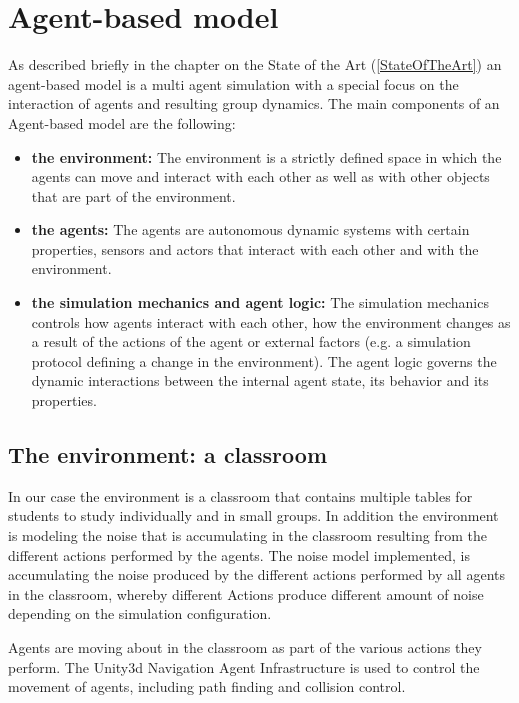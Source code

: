 \section{Agent-based model}
As described briefly in the chapter on the State of the Art (\ref{StateOfTheArt})
an agent-based model is a multi agent simulation with a special focus on the interaction
of agents and resulting group dynamics. The main components of an Agent-based
model are the following:

\begin{itemize}
    \item \textbf{the environment:} The environment is a strictly
    defined space in which the agents can move and interact with each other as 
    well as with other objects that are part of the environment. 
    \item \textbf{the agents:} The agents are autonomous dynamic systems with certain
    properties, sensors and actors that interact with each other and with the environment.
    \item \textbf{the simulation mechanics and agent logic:}  The simulation mechanics
    controls how agents interact with each other, how the environment changes
    as a result of the actions of the agent or external factors (e.g. a simulation protocol defining
    a change in the environment). The agent logic governs the dynamic interactions between
    the internal agent state, its behavior and its properties.
\end{itemize}

\subsection{The environment: a classroom}
In our case the environment is a classroom that contains multiple tables for
students to study individually and in small groups. In addition the environment
is modeling the noise that is accumulating in the classroom resulting from the
different actions performed by the agents. The noise model implemented, is
accumulating the noise produced by the different actions
performed by all agents in the classroom, whereby different Actions produce different
amount of noise depending on the simulation configuration.

Agents are moving about in the classroom as part of the various actions they perform.
The Unity3d Navigation Agent Infrastructure is used to control the movement of agents,
including path finding and collision control.

\label{agent}
